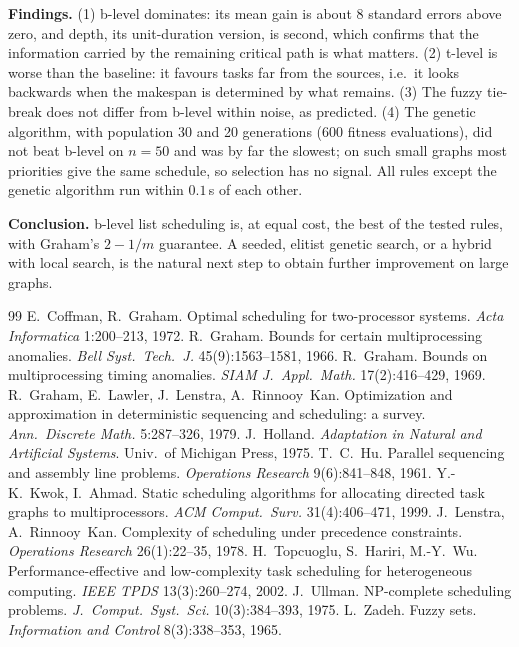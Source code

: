 \documentclass[10pt,twocolumn]{article}
\begin{document}
\textbf{Findings.} (1) b-level dominates: its mean gain is about $8$ standard errors above zero, and depth, its unit-duration version, is second, which confirms that the information carried by the remaining critical path is what matters. (2) t-level is worse than the baseline: it favours tasks far from the sources, i.e.\ it looks backwards when the makespan is determined by what remains. (3) The fuzzy tie-break does not differ from b-level within noise, as predicted. (4) The genetic algorithm, with population 30 and 20 generations ($600$ fitness evaluations), did not beat b-level on $n=50$ and was by far the slowest; on such small graphs most priorities give the same schedule, so selection has no signal. All rules except the genetic algorithm run within $0.1$\,s of each other.

\textbf{Conclusion.} b-level list scheduling is, at equal cost, the best of the tested rules, with Graham's $2-1/m$ guarantee. A seeded, elitist genetic search, or a hybrid with local search, is the natural next step to obtain further improvement on large graphs.

\footnotesize
\begin{thebibliography}{99}\setlength{\itemsep}{0pt}
 E.~Coffman, R.~Graham. Optimal scheduling for two-processor systems. \emph{Acta Informatica} 1:200--213, 1972.
 R.~Graham. Bounds for certain multiprocessing anomalies. \emph{Bell Syst.\ Tech.\ J.} 45(9):1563--1581, 1966.
 R.~Graham. Bounds on multiprocessing timing anomalies. \emph{SIAM J.\ Appl.\ Math.} 17(2):416--429, 1969.
 R.~Graham, E.~Lawler, J.~Lenstra, A.~Rinnooy~Kan. Optimization and approximation in deterministic sequencing and scheduling: a survey. \emph{Ann.\ Discrete Math.} 5:287--326, 1979.
 J.~Holland. \emph{Adaptation in Natural and Artificial Systems}. Univ.\ of Michigan Press, 1975.
 T.~C.~Hu. Parallel sequencing and assembly line problems. \emph{Operations Research} 9(6):841--848, 1961.
 Y.-K.~Kwok, I.~Ahmad. Static scheduling algorithms for allocating directed task graphs to multiprocessors. \emph{ACM Comput.\ Surv.} 31(4):406--471, 1999.
 J.~Lenstra, A.~Rinnooy~Kan. Complexity of scheduling under precedence constraints. \emph{Operations Research} 26(1):22--35, 1978.
 H.~Topcuoglu, S.~Hariri, M.-Y.~Wu. Performance-effective and low-complexity task scheduling for heterogeneous computing. \emph{IEEE TPDS} 13(3):260--274, 2002.
 J.~Ullman. NP-complete scheduling problems. \emph{J.\ Comput.\ Syst.\ Sci.} 10(3):384--393, 1975.
 L.~Zadeh. Fuzzy sets. \emph{Information and Control} 8(3):338--353, 1965.
\end{thebibliography}
\end{document}
